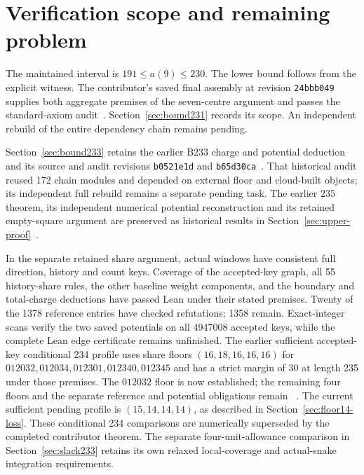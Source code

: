 \documentclass[11pt,a4paper]{article}
\theoremstyle{definition}
\theoremstyle{remark}
\begin{document}
\section{Verification scope and remaining problem}\label{sec:verification}
The maintained interval is $191\le a(9)\le230$. The lower bound
follows from the explicit witness. The contributor's saved final
assembly at revision \texttt{24bbb049} supplies both aggregate
premises of the seven-centre argument and passes the standard-axiom
audit~\cite{bound230archive}. Section~\ref{sec:bound231} records its
scope. An independent rebuild of the entire dependency chain remains
pending.

Section~\ref{sec:bound233} retains the earlier B233 charge and potential
deduction and its source and audit revisions \texttt{b0521e1d} and
\texttt{b65d30ca}~\cite{bound233archive}. That historical audit reused
172 chain modules and depended on external floor and cloud-built objects;
its independent full rebuild remains a separate pending task.
The earlier 235 theorem, its independent numerical potential reconstruction
and its retained empty-square argument are preserved as historical results
in Section~\ref{sec:upper-proof}~\cite{bound235archive}.

In the separate retained share argument, actual windows have consistent full direction,
history and count keys. Coverage of the accepted-key graph, all 55
history-share rules, the other baseline weight components, and the boundary
and total-charge deductions have passed Lean under their stated premises.
Twenty of the 1378 reference entries have checked refutations; 1358 remain.
Exact-integer scans verify the two saved potentials on all 4947008 accepted
keys, while the complete Lean edge certificate remains unfinished.
The earlier sufficient accepted-key conditional 234 profile uses share floors
$(16,18,16,16,16)$ for $012032,012034,012301,012340,012345$ and has a
strict margin of 30 at length 235 under those premises. The $012032$
floor is now established; the remaining four floors and the separate
reference and potential obligations remain
~\cite{referenceunionarchive,potentialcertificatearchive,share152archive}.
The current sufficient pending profile is $(15,14,14,14)$, as described in
Section~\ref{sec:floor14-loss}. These conditional 234 comparisons are
numerically superseded by the completed contributor theorem. The separate
four-unit-allowance comparison in Section~\ref{sec:slack233} retains its
own relaxed local-coverage and actual-snake integration requirements.
\end{document}
